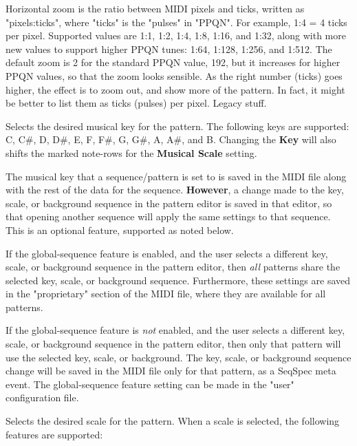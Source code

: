    Horizontal zoom is the ratio between MIDI pixels and ticks, written as
   "pixels:ticks", where "ticks" is the "pulses" in "PPQN".
   For example, 1:4 = 4 ticks per pixel.
   Supported values are 1:1, 1:2, 1:4, 1:8, 1:16, and 1:32, along with
   more new values to support higher PPQN tunes: 1:64, 1:128, 1:256, and
   1:512.
   The default zoom is 2 for the standard PPQN value, 192, but it
   increases for higher PPQN values, so that the zoom looks sensible.
   As the right number (ticks) goes higher,
   the effect is to zoom out, and show more of the pattern.
   In fact, it might be better to list them as ticks (pulses) per pixel.
   Legacy stuff.

   Selects the desired musical key for the pattern.  The following keys are
   supported:  C, C\#, D, D\#, E, F, F\#, G, G\#, A, A\#, and B.
   Changing the \textbf{Key} will also shifts the marked note-rows
   for the \textbf{Musical Scale} setting.

   The musical key that a sequence/pattern is set to is
   saved in the MIDI file along with the rest of the data for the sequence.
   \textbf{However},
   a change made to the key, scale, or background sequence in
   the pattern editor is saved in that editor, so that opening another sequence
   will apply the same settings to that sequence.  This is an optional feature,
   supported as noted below.

   If the global-sequence feature is enabled, and the user selects
   a different key, scale, or background sequence in the pattern editor, 
   then \textsl{all} patterns share the selected key, scale, or background
   sequence.  Furthermore, these settings are saved in the "proprietary"
   section of the MIDI file, where they are available for all patterns.

   If the global-sequence feature is \textsl{not} enabled, and the user selects
   a different key, scale, or background sequence in the pattern editor, 
   then only that pattern will use the selected key, scale, or background.
   The key, scale, or background sequence change will be saved in the MIDI file
   only for that pattern, as a SeqSpec meta event.
   The global-sequence feature setting can be made in the "user" configuration
   file.

   Selects the desired scale for the pattern.
   When a scale is selected, the following features are supported:


